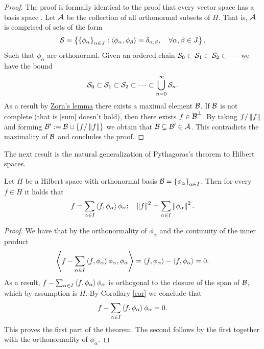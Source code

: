 \documentclass[
    a4paper,
    DIV=14,
    abstract=true,
    numbers=noenddot
]{scrartcl}
\begin{document}
	\begin{proof}
		The proof is formally identical to the proof that every vector space has a basis space . Let $\mathcal{A}$ be the collection of all orthonormal subsets of $H$. That is,  $\mathcal{A}$ is comprised of sets of the form
		\begin{align*}
			\mathcal{S}=\left\{\left\{\phi_\alpha\right\}_{\alpha \in  J}:  \left\langle\phi_\alpha,\phi_\beta \right\rangle= \delta _{\alpha, \beta }, \quad\forall \alpha,\beta \in J\right\} .
		\end{align*}
		Such that $\phi_\alpha$ are orthonormal. Given an ordered chain $\mathcal{S}_0\subset \mathcal{S}_1\subset \mathcal{S}_2\subset \cdots$ we have the bound
		\begin{align*}
			\mathcal{S}_0\subset \mathcal{S}_1\subset \mathcal{S}_2\subset \cdots \subset \bigcup_{n=0}^\infty \mathcal{S}_n  .
		\end{align*}
		As a result by \href{https://en.wikipedia.org/wiki/Zorn%27s_lemma}{Zorn's lemma} there exists a maximal element $\mathcal{B}$. If $\mathcal{B}$ is not complete (that is \eqref{sum} doesn't hold), then there exists $f \in \overline{\mathcal{B}}^\perp$. By taking $f /\left\lVert f \right\rVert$ and forming $\mathcal{B}':=\mathcal{B} \cup \left\{f / \left\lVert f \right\rVert\right\} $ we obtain that $\mathcal{B} \subsetneq \mathcal{B}' \in \mathcal{A}$. This contradicts the maximality of $\mathcal{B}$ and concludes the proof.
	\end{proof}
	The next result is the natural  generalization of Pythagoras's theorem to Hilbert spaces.
	\begin{theorem}[Parseval]\label{Parseval}
		Let $H$ be a Hilbert space with orthonormal basis  $\mathcal{B}=\left\{\phi_\alpha\right\}_{\alpha\in I}$. Then for every $f \in  H$ it holds that
		\begin{align*}
			f= \sum_{\alpha \in  I} \left\langle f,\phi_\alpha\right\rangle\phi_\alpha;\quad \left\lVert f \right\rVert^2=\sum_{\alpha\in I} \left\lVert \phi_\alpha \right\rVert^2.
		\end{align*}
	\end{theorem}
	\begin{proof}
		We have that by the orthonormality of $\phi_\alpha$ and the continuity of the inner product
		\begin{align*}
			\left\langle f-\sum_{\alpha \in  I} \left\langle f,\phi_\alpha\right\rangle\phi_\alpha, \phi_\alpha\right\rangle=\left\langle f,\phi_\alpha\right\rangle-\left\langle f,\phi_\alpha\right\rangle=0.
		\end{align*}
		As a result, $f-\sum_{\alpha \in  I} \left\langle f,\phi_\alpha\right\rangle\phi_\alpha$ is orthogonal to the closure of the span of $\mathcal{B}$, which by assumption is $H$. By Corollary
		\ref{cor} we conclude that
		\begin{align*}
			f-\sum_{\alpha \in  I} \left\langle f,\phi_\alpha\right\rangle\phi_\alpha=0.
		\end{align*}
		This proves the first part of the theorem. The second follows by the first together with the orthonormality of $\phi_\alpha$.
	\end{proof}
\end{document}

